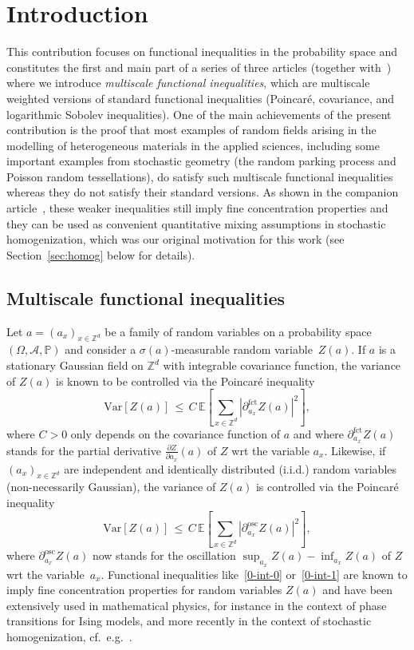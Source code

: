 \documentclass[11pt]{article}
\theoremstyle{definition}
\numberwithin{equation}{section}
\numberwithin{figure}{section}
\numberwithin{table}{section}
\newcommand{\Z}{\mathbb Z}
\newcommand{\p}{\mathbb{P}}
\newcommand{\E}{\mathbb{E}}
\newcommand{\A}{\mathcal A}
\newcommand{\parfct}[1]{\partial_{#1}^{\operatorname{fct}}}
\newcommand{\osc}{\partial^{\mathrm{osc}}}
\newcommand{\var}[1]{\mathrm{Var}\left[#1\right]}
\begin{document}
\section{Introduction}

This contribution focuses on functional inequalities in the probability space and constitutes the first and main part of a series of three articles (together with~\cite{DG1,DG3}) where we introduce \emph{multiscale functional inequalities}, which are multiscale weighted versions of standard functional inequalities (Poincaré, covariance, and logarithmic Sobolev inequalities). One of the main achievements of the present contribution is the proof that most examples of random fields arising in the modelling of heterogeneous materials in the applied sciences, including some important examples from stochastic geometry (the random parking process and Poisson random tessellations), do satisfy such multiscale functional inequalities whereas they do not satisfy their standard versions. As shown in the companion article~\cite{DG1}, these weaker inequalities still imply fine concentration properties and they can be used as convenient quantitative mixing assumptions in stochastic homogenization, which was our original motivation for this work (see Section~\ref{sec:homog} below for details).



\subsection{Multiscale functional inequalities}

Let $a=(a_x)_{x\in \Z^d}$ be a family of random variables on a probability space $(\Omega,\A,\p)$ and consider a $\sigma(a)$-measurable random variable~$Z(a)$. If $a$ is a stationary Gaussian field on $\Z^d$ with integrable covariance function, the variance of $Z(a)$ is known to be controlled via the Poincaré inequality
\begin{equation}\label{0-int-0}
\var{Z(a)} \,\le \,C\,\E\left[{\sum_{x\in \Z^d} |\parfct{a_x} Z(a)|^2}\right],
\end{equation}
where $C>0$ only depends on the covariance function of $a$ and where $\parfct{a_x} Z(a)$ stands for the partial derivative $\frac{\partial Z}{\partial a_x}(a)$ of $Z$ wrt the variable $a_x$. Likewise, if $(a_x)_{x\in \Z^d}$ are independent and identically distributed (i.i.d.) random variables (non-necessarily Gaussian), the variance of $Z(a)$ is controlled via the Poincaré inequality
\begin{equation}\label{0-int-1}
\var{Z(a)} \,\le \,C\,\E\left[{ \sum_{x\in \Z^d} |\osc_{a_x} Z(a)|^2}\right],
\end{equation}
where $\osc_{a_x} Z(a)$ now stands for the oscillation $\sup_{a_x} Z(a)-\inf_{a_x} Z(a)$ of $Z$ wrt the variable~$a_x$. Functional inequalities like~\eqref{0-int-0} or~\eqref{0-int-1} are known to imply fine concentration properties for random variables $Z(a)$ and have been extensively used in mathematical physics, for instance in the context of phase transitions for Ising models, and more recently in the context of stochastic homogenization, cf.~e.g.~\cite{DGO1,Glotto-Neukamm-14,GNO-I,Glotto-11,Glotto-12,Marahrens-Otto-15,Naddaf-Spencer-98}.
\end{document}
